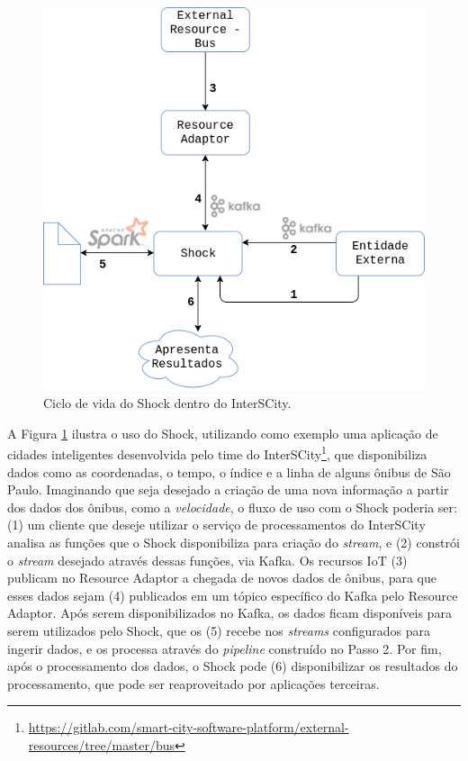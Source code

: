 \begin{figure}
  \centering
    \includegraphics[scale=0.45]{figuras/shock.png}
    \caption{Ciclo de vida do Shock dentro do InterSCity.}
  \label{fig:shock}
\end{figure}

A Figura \ref{fig:shock} ilustra o uso do Shock, utilizando como exemplo uma
aplicação de cidades inteligentes desenvolvida pelo time do
InterSCity\footnote{\url{https://gitlab.com/smart-city-software-platform/external-resources/tree/master/bus}},
que disponibiliza dados como as coordenadas, o tempo, o índice e a linha de
alguns ônibus de São Paulo. Imaginando que seja desejado a criação de uma nova
informação a partir dos dados dos ônibus, como a \textit{velocidade}, o fluxo
de uso com o Shock poderia ser: (1) um cliente que deseje utilizar o serviço
de processamentos do InterSCity analisa as funções que o Shock disponibiliza
para criação do \textit{stream}, e (2) constrói o \textit{stream} desejado através
dessas funções, via Kafka. Os recursos IoT (3) publicam no Resource Adaptor a
chegada de novos dados de ônibus, para que esses dados sejam (4) publicados em
um tópico específico do Kafka pelo Resource Adaptor. Após serem disponibilizados
no Kafka, os dados ficam disponíveis para serem utilizados pelo Shock, que os (5)
recebe nos \textit{streams} configurados para ingerir dados, e os processa
através do \textit{pipeline} construído no Passo 2. Por fim, após o
processamento dos dados, o Shock pode (6) disponibilizar os resultados do
processamento, que pode ser reaproveitado por aplicações terceiras.

